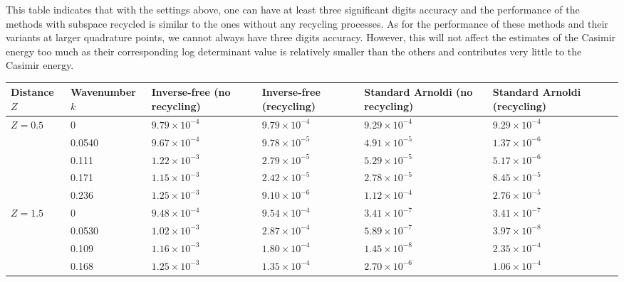 This table indicates that with the settings above, one can have at least three significant digits accuracy and the performance of the methods with subspace 
recycled is similar to the ones without any recycling processes. As for the performance of these methods and their variants at larger quadrature points, we 
cannot always have three digits accuracy. However, this will not affect the estimates of the Casimir energy too 
much as their corresponding log determinant value is relatively smaller than the others and contributes very little to the Casimir energy. 
 
\begin{table}[H]
    \centering
    \begin{tabular}{ |M{1.5cm}|M{2.0cm}|M{2.2cm} |M{2.2cm}|M{3cm}|M{3cm}|M{2.2cm}| } 
    \hline
    Distance $Z$ & Wavenumber $k$ &  Inverse-free (no recycling) & Inverse-free (recycling) & Standard Arnoldi (no recycling) & Standard Arnoldi (recycling)\\
    \hline
       & 0        & $9.79\times 10^{-4}$  & $9.79\times 10^{-4}$  &$9.29\times 10^{-4}$ &$9.29\times 10^{-4}$\\ 
                                   & 0.0540   & $9.67\times 10^{-4}$  & $9.78\times 10^{-5}$  &$4.91\times 10^{-5}$ &$1.37\times 10^{-6}$\\ 
                                   & 0.111    & $1.22\times 10^{-3}$  & $2.79\times 10^{-5}$  &$5.29\times 10^{-5}$ &$5.17\times 10^{-6}$\\ 
                                   & 0.171    & $1.15\times 10^{-3}$  & $2.42\times 10^{-5}$  &$2.78\times 10^{-5}$ &$8.45\times 10^{-5}$\\ 
                                   & 0.236    & $1.25\times 10^{-3}$  & $9.10\times 10^{-6}$  &$1.12\times 10^{-4}$ &$2.76\times 10^{-5}$\\ 
    \hline
    \hline
       & 0        & $9.48\times 10^{-4}$  & $9.54\times 10^{-4}$  &$3.41\times 10^{-7}$ &$3.41\times 10^{-7}$\\ 
                                   & 0.0530   & $1.02\times 10^{-3}$  & $2.87\times 10^{-4}$  &$5.89\times 10^{-7}$ &$3.97\times 10^{-8}$\\ 
                                   & 0.109    & $1.16\times 10^{-3}$  & $1.80\times 10^{-4}$  &$1.45\times 10^{-8}$ &$2.35\times 10^{-4}$\\ 
                                   & 0.168    & $1.25\times 10^{-3}$  & $1.35\times 10^{-4}$  &$2.70\times 10^{-6}$ &$1.06\times 10^{-4}$\\ 

\end{tabular}
\end{table}
